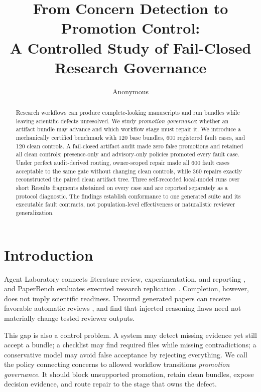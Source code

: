 \documentclass[11pt]{article}
\title{From Concern Detection to Promotion Control:\\
A Controlled Study of Fail-Closed Research Governance}
\author{Anonymous}
\begin{document}
\maketitle

\begin{abstract}
Research workflows can produce complete-looking manuscripts and run bundles
while leaving scientific defects unresolved. We study \emph{promotion
governance}: whether an artifact bundle may advance and which workflow stage
must repair it. We introduce a mechanically certified benchmark with 120 base
bundles, 600 registered fault cases, and 120 clean controls. A fail-closed
artifact audit made zero false promotions and retained all clean controls;
presence-only and advisory-only policies promoted every fault case. Under
perfect audit-derived routing, owner-scoped repair made all 600 fault cases
acceptable to the same gate without changing clean controls, while 360 repairs
exactly reconstructed the paired clean artifact tree. Three self-recorded
local-model runs over short Results fragments abstained on every case and are
reported separately as a protocol diagnostic. The findings establish
conformance to one generated suite and its executable fault contracts, not
population-level effectiveness or naturalistic reviewer generalization.
\end{abstract}

\section{Introduction}

Agent Laboratory connects literature review, experimentation, and reporting
\cite{schmidgall-etal-2025-agent}, and PaperBench evaluates executed
research replication \cite{starace2025paperbench}. Completion, however, does
not imply scientific readiness. Unsound generated papers can receive favorable
automatic reviews \cite{jiang-etal-2026-badscientist}, and \citet{dycke-gurevych-2026-automatic}
find that injected reasoning flaws need not materially change tested reviewer
outputs.

This gap is also a control problem. A system may detect missing evidence yet
still accept a bundle; a checklist may find required files while missing
contradictions; a conservative model may avoid false acceptance by rejecting
everything. We call the policy connecting concerns to allowed workflow
transitions \emph{promotion governance}. It should block unsupported
promotion, retain clean bundles, expose decision evidence, and route repair to
the stage that owns the defect.
\end{document}
